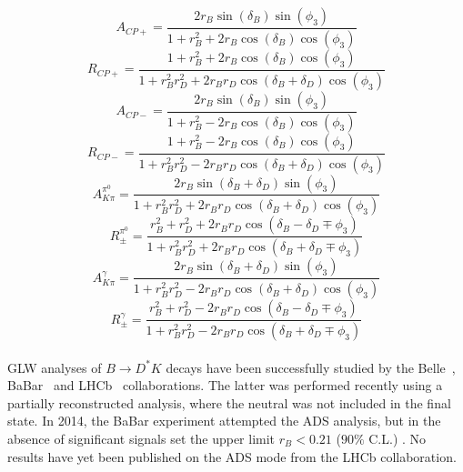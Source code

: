 \documentclass[oneside,12pt]{article}
\begin{document}
  \begin{equation}
		A_{CP+}=\frac{2r_{B}\sin(\delta_{B})\sin(\phi_{3})}{1+r_{B}^{2}+2r_{B}\cos(\delta_{B})\cos(\phi_{3})}
    \label{eq:ACPPlus}
  \end{equation}
  \begin{equation}
		R_{CP+}=\frac{1 + r_{B}^{2} + 2r_{B}\cos(\delta_{B})\cos(\phi_{3})}{1+r_{B}^{2}r_{D}^{2}+2r_{B}r_{D}\cos(\delta_{B}+\delta_{D})\cos(\phi_{3})}
    \label{eq:RCPPlus}
  \end{equation}
  \begin{equation}
		A_{CP-}=\frac{2r_{B}\sin(\delta_{B})\sin(\phi_{3})}{1+r_{B}^{2}-2r_{B}\cos(\delta_{B})\cos(\phi_{3})}
    \label{eq:ACPMinus}
  \end{equation}
  \begin{equation}
		R_{CP-}=\frac{1 + r_{B}^{2} - 2r_{B}\cos(\delta_{B})\cos(\phi_{3})}{1+r_{B}^{2}r_{D}^{2}-2r_{B}r_{D}\cos(\delta_{B}+\delta_{D})\cos(\phi_{3})}
    \label{eq:RCPMinus}
  \end{equation}
  \begin{equation}
		A_{K\pi}^{\pi^{0}}=\frac{2r_{B}\sin(\delta_{B}+\delta_{D})\sin(\phi_{3})}{1+r_{B}^{2}r_{D}^{2}+2r_{B}r_{D}\cos(\delta_{B}+\delta_{D})\cos(\phi_{3})}
    \label{eq:AfavPi0}
  \end{equation}
  \begin{equation}
		R_{\pm}^{\pi^{0}}=\frac{r_{B}^{2} + r_{D}^{2} + 2r_{B}r_{D}\cos(\delta_{B}-\delta_{D}\mp \phi_{3})}{1+r_{B}^{2}r_{D}^{2}+2r_{B}r_{D}\cos(\delta_{B}+\delta_{D}\mp \phi_{3})}
    \label{eq:RPlusMinusPi0}
  \end{equation}
  \begin{equation}
		A_{K\pi}^{\gamma}=\frac{2r_{B}\sin(\delta_{B}+\delta_{D})\sin(\phi_{3})}{1+r_{B}^{2}r_{D}^{2}-2r_{B}r_{D}\cos(\delta_{B}+\delta_{D})\cos(\phi_{3})}
    \label{eq:AfavGamma}
  \end{equation}
  \begin{equation}
		R_{\pm}^{\gamma}=\frac{r_{B}^{2} + r_{D}^{2} - 2r_{B}r_{D}\cos(\delta_{B}-\delta_{D}\mp \phi_{3})}{1+r_{B}^{2}r_{D}^{2}-2r_{B}r_{D}\cos(\delta_{B}+\delta_{D}\mp \phi_{3})}
    \label{eq:RPlusMinusGamma}
  \end{equation}
\\
\noindent GLW analyses of $B\rightarrow D^{*}K$ decays have been successfully studied by the Belle~\cite{BelleGLW}, BaBar~\cite{BaBarGLW} and LHCb~\cite{PartReco} collaborations. The latter was performed recently using a partially reconstructed analysis, where the neutral was not included in the final state. In 2014, the BaBar experiment attempted the ADS analysis, but in the absence of significant signals set the upper limit $r_B<0.21$ ($90\%$ C.L.) \cite{BaBarADS}. No results have yet been published on the ADS mode from the LHCb collaboration. 
\end{document}
